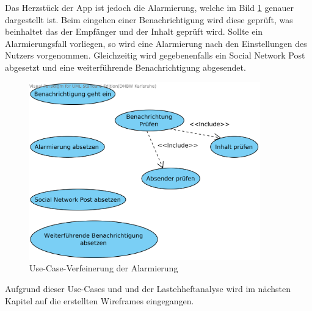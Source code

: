 Das Herzst\"uck der App ist jedoch die Alarmierung, welche im Bild \ref{Alarmierung Use Case} genauer dargestellt ist. Beim eingehen einer Benachrichtigung wird diese gepr\"uft, was beinhaltet das der Empf\"anger und der Inhalt gepr\"uft wird. Sollte ein Alarmierungsfall vorliegen, so wird eine Alarmierung nach den Einstellungen des Nutzers vorgenommen. Gleichzeitig wird gegebenenfalls ein Social Network Post abgesetzt und eine weiterf\"uhrende Benachrichtigung abgesendet.
\begin{figure}[!ht]
\centering
\includegraphics[width=10cm]{Bilder/UseCaseAlarmierung.png}
\caption{Use-Case-Verfeinerung der Alarmierung}
\label{Alarmierung Use Case}
\centering
\end{figure}

Aufgrund dieser Use-Cases und und der Lastehheftanalyse wird im n\"achsten Kapitel auf die erstellten Wireframes eingegangen.